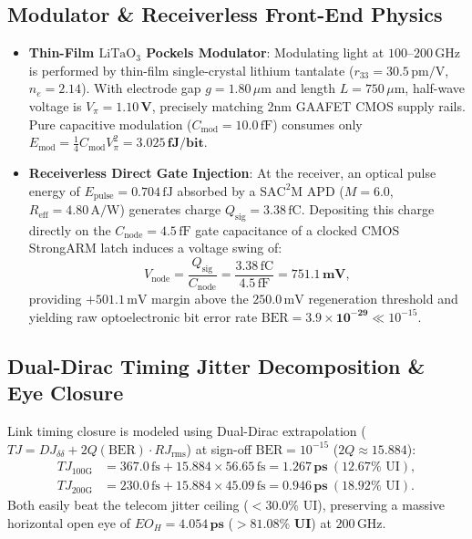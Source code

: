 \documentclass[journal]{IEEEtran}
\begin{document}
\subsection{Modulator \& Receiverless Front-End Physics}
\begin{itemize}
    \item \textbf{Thin-Film $\text{LiTaO}_3$ Pockels Modulator}: Modulating light at $100\text{--}200\,\text{GHz}$ is performed by thin-film single-crystal lithium tantalate ($r_{33} = 30.5\,\text{pm/V}$, $n_e = 2.14$). With electrode gap $g = 1.80\,\mu\text{m}$ and length $L = 750\,\mu\text{m}$, half-wave voltage is $V_\pi = \mathbf{1.10\,\text{V}}$, precisely matching 2nm GAAFET CMOS supply rails. Pure capacitive modulation ($C_{\text{mod}} = 10.0\,\text{fF}$) consumes only $E_{\text{mod}} = \frac{1}{4} C_{\text{mod}} V_\pi^2 = \mathbf{3.025\,\text{fJ/bit}}$.
    \item \textbf{Receiverless Direct Gate Injection}: At the receiver, an optical pulse energy of $E_{\text{pulse}} = 0.704\,\text{fJ}$ absorbed by a $\text{SAC}^2\text{M}$ APD ($M=6.0$, $R_{\text{eff}} = 4.80\,\text{A/W}$) generates charge $Q_{\text{sig}} = 3.38\,\text{fC}$. Depositing this charge directly on the $C_{\text{node}} = 4.5\,\text{fF}$ gate capacitance of a clocked CMOS StrongARM latch induces a voltage swing of:
    \begin{equation}
        V_{\text{node}} = \frac{Q_{\text{sig}}}{C_{\text{node}}} = \frac{3.38\,\text{fC}}{4.5\,\text{fF}} = \mathbf{751.1\,\text{mV}},
    \end{equation}
    providing $+501.1\,\text{mV}$ margin above the $250.0\,\text{mV}$ regeneration threshold and yielding raw optoelectronic bit error rate $\text{BER} = \mathbf{3.9 \times 10^{-29}} \ll 10^{-15}$.
\end{itemize}

\subsection{Dual-Dirac Timing Jitter Decomposition \& Eye Closure}
Link timing closure is modeled using Dual-Dirac extrapolation ($TJ = DJ_{\delta\delta} + 2 Q(\text{BER}) \cdot RJ_{\text{rms}}$) at sign-off $\text{BER} = 10^{-15}$ ($2Q \approx 15.884$):
\begin{align}
    TJ_{100\text{G}} &= 367.0\,\text{fs} + 15.884 \times 56.65\,\text{fs} = \mathbf{1.267\,\text{ps}} \ (12.67\%\text{ UI}), \\
    TJ_{200\text{G}} &= 230.0\,\text{fs} + 15.884 \times 45.09\,\text{fs} = \mathbf{0.946\,\text{ps}} \ (18.92\%\text{ UI}).
\end{align}
Both easily beat the telecom jitter ceiling ($<30.0\%$ UI), preserving a massive horizontal open eye of $EO_H = \mathbf{4.054\,\text{ps}}$ ($\mathbf{>81.08\%\text{ UI}}$) at $200\,\text{GHz}$.
\end{document}
